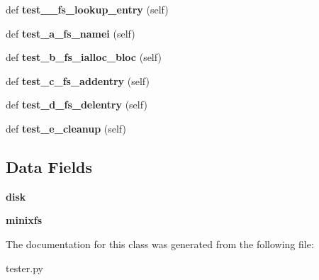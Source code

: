 \begin{DoxyCompactItemize}
\item 
\hypertarget{classtester_1_1_minix_tester_a439662ecb793a5fa39d2a81b82bc3844}{}def {\bfseries test\+\_\+\_\+fs\+\_\+lookup\+\_\+entry} (self)\label{classtester_1_1_minix_tester_a439662ecb793a5fa39d2a81b82bc3844}

\item 
\hypertarget{classtester_1_1_minix_tester_a2d40ca23d704b6a3dba89feaaa46ef4e}{}def {\bfseries test\+\_\+a\+\_\+fs\+\_\+namei} (self)\label{classtester_1_1_minix_tester_a2d40ca23d704b6a3dba89feaaa46ef4e}

\item 
\hypertarget{classtester_1_1_minix_tester_aff18c3a4f0015a9a7b9a077ee489a1c4}{}def {\bfseries test\+\_\+b\+\_\+fs\+\_\+ialloc\+\_\+bloc} (self)\label{classtester_1_1_minix_tester_aff18c3a4f0015a9a7b9a077ee489a1c4}

\item 
\hypertarget{classtester_1_1_minix_tester_a98f3830996534231f31445b8682a5cec}{}def {\bfseries test\+\_\+c\+\_\+fs\+\_\+addentry} (self)\label{classtester_1_1_minix_tester_a98f3830996534231f31445b8682a5cec}

\item 
\hypertarget{classtester_1_1_minix_tester_a098038e121b2415dbec422f5604bf94c}{}def {\bfseries test\+\_\+d\+\_\+fs\+\_\+delentry} (self)\label{classtester_1_1_minix_tester_a098038e121b2415dbec422f5604bf94c}

\item 
\hypertarget{classtester_1_1_minix_tester_a97a872c974641d654f3c414bf46678e8}{}def {\bfseries test\+\_\+e\+\_\+cleanup} (self)\label{classtester_1_1_minix_tester_a97a872c974641d654f3c414bf46678e8}

\end{DoxyCompactItemize}
\subsection*{Data Fields}
\begin{DoxyCompactItemize}
\item 
\hypertarget{classtester_1_1_minix_tester_a36c7b5664c44733896398e42189f7c6f}{}{\bfseries disk}\label{classtester_1_1_minix_tester_a36c7b5664c44733896398e42189f7c6f}

\item 
\hypertarget{classtester_1_1_minix_tester_afbd779c08c2307f759986f8ade741268}{}{\bfseries minixfs}\label{classtester_1_1_minix_tester_afbd779c08c2307f759986f8ade741268}

\end{DoxyCompactItemize}


The documentation for this class was generated from the following file\+:\begin{DoxyCompactItemize}
\item 
tester.\+py\end{DoxyCompactItemize}
